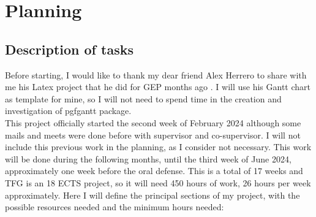 \chapter{Planning}
\section{Description of tasks}
Before starting, I would like to thank my dear friend Alex Herrero to share with me his Latex project that he did for GEP months ago \cite{herrero_bravo_experimental_2024}.
I will use his Gantt chart as template for mine, so I will not need to spend time in the creation and investigation of pgfgantt package. \\

This project officially started the second week of February 2024 although some mails and meets were done before with supervisor and co-supervisor.
I will not include this previous work in the planning, as I consider not necessary.
This work will be done during the following months, until the third week of June 2024, approximately one week before the oral defense.
This is a total of 17 weeks and TFG is an 18 ECTS project, so it will need 450 hours of work, 26 hours per week approximately.
Here I will define the principal sections of my project, with the possible resources needed and the minimum hours needed:

